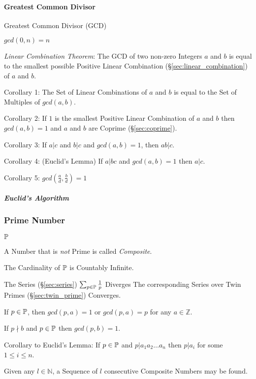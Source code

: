 \paragraph{Greatest Common Divisor}\label{sec:gcd}\hfill

Greatest Common Divisor (GCD)

$gcd(0,n) = n$

\emph{Linear Combination Theorem}: The GCD of two non-zero Integers
$a$ and $b$ is equal to the smallest possible Positive Linear
Combination (\S\ref{sec:linear_combination}) of $a$ and $b$.

Corollary 1: The Set of Linear Combinations of $a$ and $b$ is equal to
the Set of Multiples of $gcd(a,b)$.

Corollary 2: If $1$ is the smallest Positive Linear Combination of $a$
and $b$ then $gcd(a,b) = 1$ and $a$ and $b$ are Coprime
(\S\ref{sec:coprime}).

Corollary 3: If $a|c$ and $b|c$ and $gcd(a,b) = 1$, then $ab|c$.

Corollary 4: (Euclid's Lemma) If $a | bc$ and $gcd(a,b) = 1$ then
$a|c$.

Corollary 5: $gcd(\frac{a}{d}, \frac{b}{d}) = 1$



\subparagraph{Euclid's Algorithm}\label{sec:euclids_algorithm}\hfill



\subsubsection{Prime Number}\label{sec:prime_number}

$\mathbb{P}$

A Number that is \emph{not} Prime is called \emph{Composite}.

The Cardinality of $\mathbb{P}$ is Countably Infinite.

The Series (\S\ref{sec:series}) $\sum_{p \in \mathbb{P}} \frac{1}{p}$
Diverges The corresponding Series over Twin Primes
(\S\ref{sec:twin_prime}) Converges.

If $p \in \mathbb{P}$, then $gcd(p,a) = 1$ or $gcd(p,a) = p$ for any
$a \in \mathbb{Z}$.

If $p \nmid b$ and $p \in \mathbb{P}$ then $gcd (p,b) = 1$.

Corollary to Euclid's Lemma: If $p \in \mathbb{P}$ and $p|a_1 a_2
\ldots a_n$ then $p|a_i$ for some $1 \leq i \leq n$.

Given any $l \in \mathbb{N}$, a Sequence of $l$ consecutive Composite
Numbers may be found.

